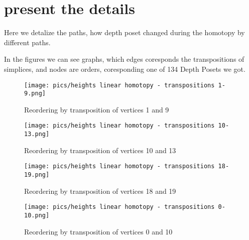 \documentclass{article}
\begin{document}
\begin{center}
\end{center}
\newpage 


\section{present the details}
\par Here we detalize the paths, how depth poset changed during the homotopy by different paths.
\par In the figures we can see graphs, which edges coresponds the transpositions of simplices, and nodes are orders, coresponding one of 134 Depth Posets we got.
\begin{figure}[htbp]
    \centering
    \texttt{[image: pics/heights linear homotopy - transpositions 1-9.png]}
    \caption{Reordering by transposition of vertices 1 and 9}
    \label{fig:transposition1and9}
\end{figure}
\begin{figure}[htbp]
    \centering
    \texttt{[image: pics/heights linear homotopy - transpositions 10-13.png]}
    \caption{Reordering by transposition of vertices 10 and 13}
    \label{fig:transposition10and13}
\end{figure}
\begin{figure}[htbp]
    \centering
    \texttt{[image: pics/heights linear homotopy - transpositions 18-19.png]}
    \caption{Reordering by transposition of vertices 18 and 19}
    \label{fig:transposition18and19}
\end{figure}
\begin{figure}[htbp]
    \centering
    \texttt{[image: pics/heights linear homotopy - transpositions 0-10.png]}
    \caption{Reordering by transposition of vertices 0 and 10}
    \label{fig:transposition0and10}
\end{figure}
\end{document}
